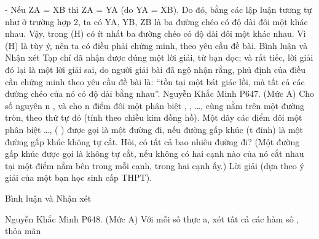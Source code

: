 \begin{multicols}{2}
	- Nếu ZA = XB thì ZA = YA (do YA = XB). Do đó, bằng các lập luận tương tự như ở trường hợp 2, ta có YA, YB, ZB là ba đường chéo có độ dài đôi một khác nhau.
	Vậy, trong (H) có ít nhất ba đường chéo có độ dài đôi một khác nhau.
	Vì (H) là tùy ý, nên ta có điều phải chứng minh, theo yêu cầu đề bài.
	Bình luận và Nhận xét
	Tạp chí đã nhận được đúng một lời giải, từ bạn đọc; và rất tiếc, lời giải đó lại là một lời giải sai, do người giải bài đã ngộ nhận rằng, phủ định của điều cần chứng minh theo yêu cầu đề bài là: “tồn tại một bát giác lồi, mà tất cả các đường chéo của nó có độ dài bằng nhau”.
	Nguyễn Khắc Minh
	P647. (Mức A) Cho số nguyên n , và cho n điểm đôi một phân biệt  ,  , …,   cùng nằm trên một đường tròn, theo thứ tự đó (tính theo chiều kim đồng hồ). Một dãy các điểm đôi một phân biệt    …,   ( ) được gọi là một đường đi, nếu đường gấp khúc  (t đỉnh) là một đường gấp khúc không tự cắt. Hỏi, có tất cả bao nhiêu đường đi?
	(Một đường gấp khúc được gọi là không tự cắt, nếu không có hai cạnh nào của nó cắt nhau tại một điểm nằm bên trong mỗi cạnh, trong hai cạnh ấy.)
	Lời giải (dựa theo ý giải của một bạn học sinh cấp THPT).
	
	Bình luận và Nhận xét
	
	Nguyễn Khắc Minh
	P648. (Mức A) Với mỗi số thực a, xét tất cả các hàm số  , thỏa mãn
	

\end{multicols}
